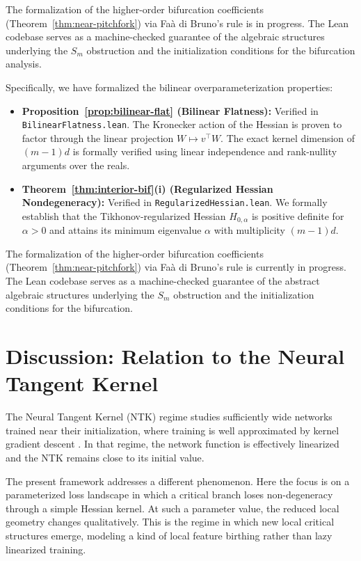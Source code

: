 \documentclass[11pt, reqno]{amsart}
\theoremstyle{plain}
\theoremstyle{definition}
\theoremstyle{remark}
\begin{document}
The formalization of the higher-order bifurcation coefficients (Theorem~\ref{thm:near-pitchfork}) via Fa\`a di Bruno's rule is in progress.  The Lean codebase serves as a machine-checked guarantee of the algebraic structures underlying the $S_m$ obstruction and the initialization conditions for the bifurcation analysis.
 
 

Specifically, we have formalized the bilinear overparameterization properties:
\begin{itemize}[leftmargin=*]
    \item \textbf{Proposition~\ref{prop:bilinear-flat} (Bilinear Flatness):} Verified in \texttt{BilinearFlatness.lean}. The Kronecker action of the Hessian is proven to factor through the linear projection $W \mapsto v^\top W$. The exact kernel dimension of $(m-1)d$ is formally verified using linear independence and rank-nullity arguments over the reals.
    \item \textbf{Theorem~\ref{thm:interior-bif}(i) (Regularized Hessian Nondegeneracy):} Verified in \texttt{RegularizedHessian.lean}. We formally establish that the Tikhonov-regularized Hessian $H_{0,\alpha}$ is positive definite for $\alpha>0$ and attains its minimum eigenvalue $\alpha$ with multiplicity $(m-1)d$.
\end{itemize}

The formalization of the higher-order bifurcation coefficients (Theorem~\ref{thm:near-pitchfork}) via Fa\`a di Bruno's rule is currently in progress. The Lean codebase serves as a machine-checked guarantee of the abstract algebraic structures underlying the $S_m$ obstruction and the initialization conditions for the bifurcation.

\section{Discussion: Relation to the Neural Tangent Kernel}\label{sec:NTK}

The Neural Tangent Kernel (NTK) regime studies sufficiently wide networks trained near their initialization, where training is well approximated by kernel gradient descent \cite{jacot2018}. In that regime, the network function is effectively linearized and the NTK remains close to its initial value.

The present framework addresses a different phenomenon. Here the focus is on a parameterized loss landscape in which a critical branch loses non-degeneracy through a simple Hessian kernel. At such a parameter value, the reduced local geometry changes qualitatively. This is the regime in which new local critical structures emerge, modeling a kind of local feature birthing rather than lazy linearized training.
\end{document}
